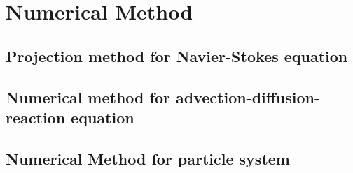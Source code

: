 \chapter{Numerical Method}
\section{Projection method for Navier-Stokes equation}

\section{Numerical method for advection-diffusion-reaction equation}

\section{Numerical Method for particle system}
